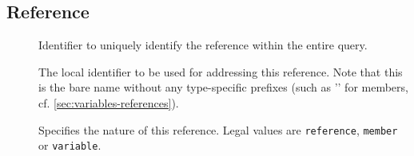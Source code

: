 \documentclass[11pt,a4paper]{article}
\begin{document}
\subsection{Reference}
\label{sec:json-ld-reference}
\begin{attributes}{}
\end{attributes}
\begin{description}
	\item[] Identifier to uniquely identify the reference within the entire query.
	\item[] The local identifier to be used for addressing this reference. Note that this is the bare name without any type-specific prefixes (such as '\textdollar' for members, cf. \cref{sec:variables-references}).
	\item[] Specifies the nature of this reference. Legal values are \texttt{reference}, \texttt{member} or \texttt{variable}.
\end{description}

\end{document}
